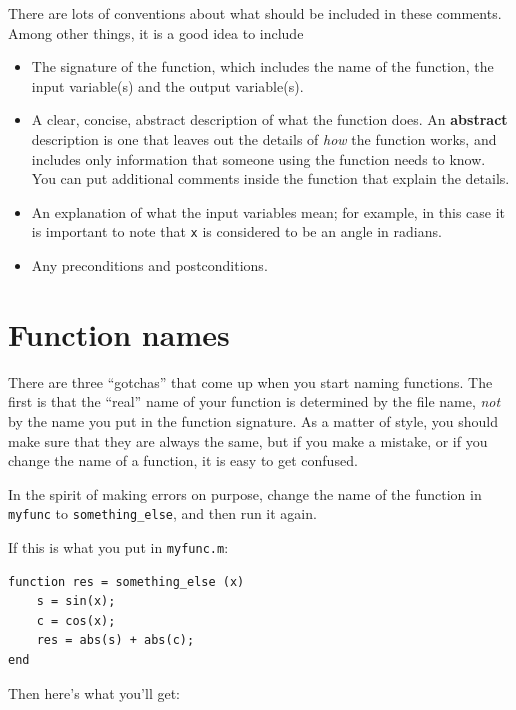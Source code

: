 \documentclass{book}
\begin{document}
There are lots of conventions about what should be included
in these comments.  Among other things, it is a good idea to
include

\begin{itemize}

\item The signature of the function, which includes the name
of the function, the input variable(s) and the output variable(s).

\item A clear, concise, abstract description of what the function does.
An {\bf abstract} description is one that leaves out the
details of {\em how} the function works, and includes only information
that someone using the function needs to know.  You can put additional
comments inside the function that explain the details.

\item An explanation of what the input variables mean; for example,
in this case it is important to note that {\tt x} is considered
to be an angle in radians.

\item Any preconditions and postconditions.

\end{itemize}



\section{Function names}

There are three ``gotchas'' that come up when you start naming
functions.  The first is that the ``real'' name of your function
is determined by the file name, {\em not} by the name
you put in the function signature.  As a matter of style, you
should make sure that they are always the same, but if you
make a mistake, or if you change the name of a function, it is
easy to get confused.

In the spirit of making errors on purpose, change the name of
the function in {\tt myfunc} to {\tt something\_else}, and
then run it again.

If this is what you put in {\tt myfunc.m}:

\begin{verbatim}
function res = something_else (x)
    s = sin(x);
    c = cos(x);
    res = abs(s) + abs(c);
end
\end{verbatim}

Then here's what you'll get:
\end{document}
